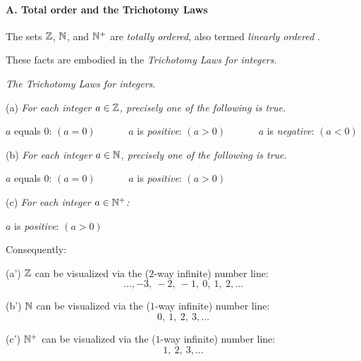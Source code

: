 \paragraph{\small\sf A. Total order and the Trichotomy Laws}

The sets $\mathbb{Z}$, $\mathbb{N}$, and $\mathbb{N}^+$ are {\em totally ordered},
also termed {\em linearly ordered}
.

\smallskip

These facts are embodied in the {\em Trichotomy Laws for integers}.

\medskip

{\it The Trichotomy Laws for integers}.

\smallskip

(a)
%
{\it For each integer $a \in \mathbb{Z}$, precisely one of the following is true.}

\hspace*{.2in} $a$ equals $0$: $(a=0)$ \ \ \ \ \ \
 $a$ is {\em positive}: $(a>0)$ \ \ \ \ \ \
 $a$ is {\em negative}: $(a<0)$

\smallskip

(b)
%
{\it For each integer $a \in \mathbb{N}$, precisely one of the following is true.}

\hspace*{.2in} $a$ equals $0$: $(a=0)$ \ \ \ \ \ \
 $a$ is {\em positive}: $(a>0)$

\smallskip

(c)
%
{\it For each integer $a \in \mathbb{N}^+$:}

\hspace*{.2in} $a$ is {\em positive}: $(a>0)$

\bigskip

Consequently:

\smallskip

(a')
$\mathbb{Z}$ can be visualized via the ($2$-way infinite) number line:
\[ \ldots, -3, \  -2, \ -1, \ 0, \ 1,\  2, \ldots \]

\smallskip

(b')
$\mathbb{N}$ can be visualized via the ($1$-way infinite) number line:
\[  0, \ 1, \ 2, \ 3, \ldots \]

\smallskip

(c')
$\mathbb{N}^+$ can be visualized via the ($1$-way infinite) number line:
\[  1, \ 2, \ 3, \ldots \]


